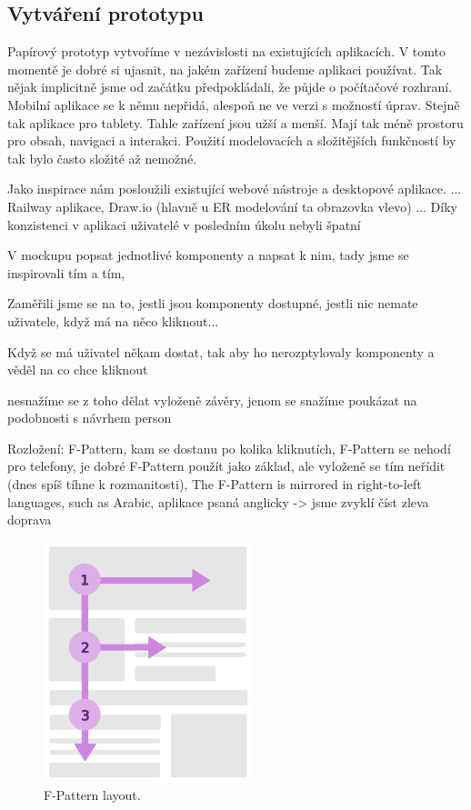 \subsection{Vytváření prototypu}

Papírový prototyp vytvoříme v nezávislosti na existujících aplikacích. V tomto momentě je dobré si ujasnit, na jakém zařízení budeme aplikaci používat. Tak nějak implicitně jsme od začátku předpokládali, že půjde o počítačové rozhraní. Mobilní aplikace se k němu nepřidá, alespoň ne ve verzi s možností úprav. Stejně tak aplikace pro tablety. Tahle zařízení jsou užší a menší. Mají tak méně prostoru pro obsah, navigaci a interakci. Použití modelovacích a složitějších funkčností by tak bylo často složité až nemožné.

Jako inspirace nám posloužili existující webové nástroje a desktopové aplikace.  ... Railway aplikace, Draw.io (hlavně u ER modelování ta obrazovka vlevo)   ... Díky konzistenci v aplikaci uživatelé v posledním úkolu nebyli špatní 

V mockupu popsat jednotlivé komponenty a napsat k nim, tady jsme se inspirovali tím a tím,

Zaměřili jsme se na to, jestli jsou komponenty dostupné, jestli nic nemate uživatele, když má na něco kliknout...

Když se má uživatel někam dostat, tak aby ho nerozptylovaly komponenty a věděl na co chce kliknout

nesnažíme se z toho dělat vyloženě závěry, jenom se snažíme poukázat na podobnosti s návrhem person

Rozložení: F-Pattern, kam se dostanu po kolika kliknutích, F-Pattern se nehodí pro telefony, je dobré F-Pattern použít jako základ, ale vyloženě se tím neřídit (dnes spíš tíhne k rozmanitosti), The F-Pattern is mirrored in right-to-left languages, such as Arabic, aplikace psaná anglicky -> jsme zvyklí číst zleva doprava

\begin{figure}[htb]
    \centering
    \includegraphics[height=70mm]{../img/F-Pattern}
    \caption{F-Pattern layout.}
    \label{obr03:fpattern}
  \end{figure}

